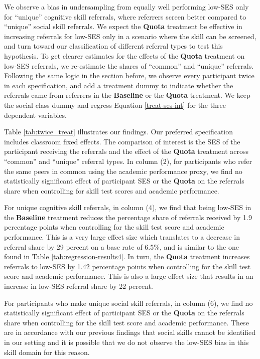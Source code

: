 \documentclass[11pt,a4paper,oneside]{article}
\begin{document}
  We observe a bias in undersampling from equally well performing low-SES only for ``unique'' cognitive skill referrals, where referrers screen better compared to ``unique'' social skill referrals. We expect the \textbf{Quota} treatment be effective in increasing referrals for low-SES only in a scenario where the skill can be screened, and turn toward our classification of different referral types to test this hypothesis. To get clearer estimates for the effects of the \textbf{Quota} treatment on low-SES referrals, we re-estimate the shares of ``common'' and ``unique'' referrals. Following the same logic in the section before, we observe every participant twice in each specification, and add a treatment dummy to indicate whether the referrals came from referrers in the \textbf{Baseline} or the \textbf{Quota} treatment. We keep the social class dummy and regress Equation \ref{treat-ses-int} for the three dependent variables.

  Table \ref{tab:twice_treat} illustrates our findings. Our preferred specification includes classroom fixed effects. The comparison of interest is the SES of the participant receiving the referrals and the effect of the \textbf{Quota} treatment across ``common'' and ``unique'' referral types. In column (2), for participants who refer the same peers in common using the academic performance proxy, we find no statistically significant effect of participant SES or the \textbf{Quota} on the referrals share when controlling for skill test scores and academic performance.

  For unique cognitive skill referrals, in column (4), we find that being low-SES in the \textbf{Baseline} treatment reduces the percentage share of referrals received by 1.9 percentage points when controlling for the skill test score and academic performance. This is a very large effect size which translates to a decrease in referral share by 29 percent on a base rate of 6.5\%, and is similar to the one found in Table \ref{tab:regression-results4}. In turn, the \textbf{Quota} treatment increases referrals to low-SES by 1.42 percentage points when controlling for the skill test score and academic performance. This is also a large effect size that results in an increase in low-SES referral share by 22 percent. 
  
  For participants who make unique social skill referrals, in column (6), we find no statistically significant effect of participant SES or the \textbf{Quota} on the referrals share when controlling for the skill test score and academic performance. These are in accordance with our previous findings that social skills cannot be identified in our setting and it is possible that we do not observe the low-SES bias in this skill domain for this reason.
  
\end{document}
